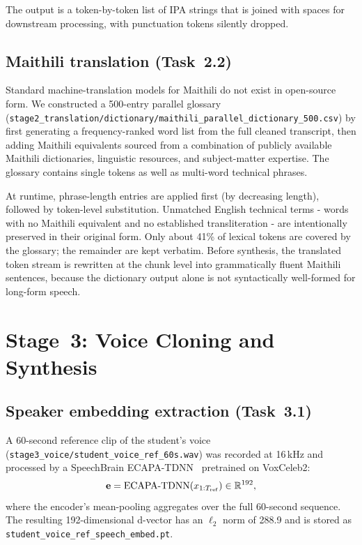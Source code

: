 \documentclass[10pt,twocolumn,letterpaper]{article}
\begin{document}
The output is a token-by-token list of IPA strings that is joined with
spaces for downstream processing, with punctuation tokens silently
dropped.

\subsection{Maithili translation (Task~2.2)}
\label{sec:trans}

Standard machine-translation models for Maithili do not exist in
open-source form.  We constructed a 500-entry parallel glossary
(\texttt{stage2\_translation/dictionary/maithili\_parallel\_dictionary\_500.csv})
by first generating a frequency-ranked word list from the full cleaned
transcript, then adding Maithili equivalents sourced from a combination
of publicly available Maithili dictionaries, linguistic resources, and
subject-matter expertise.  The glossary contains single tokens as well
as multi-word technical phrases.

At runtime, phrase-length entries are applied first (by decreasing
length), followed by token-level substitution.  Unmatched English
technical terms - words with no Maithili equivalent and no
established transliteration - are intentionally preserved in their
original form.  Only about 41\% of lexical tokens are covered by the
glossary; the remainder are kept verbatim.  Before synthesis, the
translated token stream is rewritten at the chunk level into
grammatically fluent Maithili sentences, because the dictionary
output alone is not syntactically well-formed for long-form speech.

\section{Stage~3: Voice Cloning and Synthesis}
\label{sec:part3}

\subsection{Speaker embedding extraction (Task~3.1)}
\label{sec:embed}

A 60-second reference clip of the student's voice
(\texttt{stage3\_voice/student\_voice\_ref\_60s.wav}) was recorded
at 16\,kHz and processed by a SpeechBrain
ECAPA-TDNN~\cite{desplanques2020ecapa,ravanelli2021speechbrain}
pretrained on VoxCeleb2:
\begin{equation}
  \mathbf{e} = \mathrm{ECAPA\text{-}TDNN}(x_{1:T_{\rm ref}})
             \in\mathbb{R}^{192},
  \label{eq:ecapa}
\end{equation}
where the encoder's mean-pooling aggregates over the full 60-second
sequence.  The resulting 192-dimensional d-vector has an $\ell_2$ norm
of 288.9 and is stored as \texttt{student\_voice\_ref\_speech\_embed.pt}.
\end{document}
